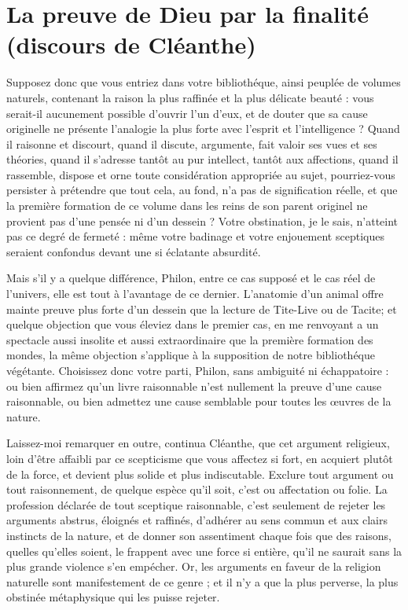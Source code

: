 
\section{La preuve de Dieu par la finalité (discours de Cléanthe)}
Supposez donc que vous entriez dans votre bibliothéque,
ainsi peuplée de volumes naturels, contenant la
raison la plus raffinée et la plus délicate beauté : vous
serait-il aucunement possible d’ouvrir l’un d’eux, et de
douter que sa cause originelle ne présente l'analogie la
plus forte avec l’esprit et l'intelligence ? Quand il raisonne
et discourt, quand il discute, argumente, fait valoir ses
vues et ses théories, quand il s’adresse tantôt au pur
intellect, tantôt aux affections, quand il rassemble, dispose
et orne toute considération appropriée au sujet,
pourriez-vous persister à prétendre que tout cela, au fond,
n’a pas de signification réelle, et que la première formation
de ce volume dans les reins de son parent originel ne
provient pas d’une pensée ni d’un dessein ? Votre obstination,
je le sais, n’atteint pas ce degré de fermeté : même
votre badinage et votre enjouement sceptiques seraient
confondus devant une si éclatante absurdité.

Mais s’il y a quelque différence, Philon, entre ce cas
supposé et le cas réel de l’univers, elle est tout à l’avantage
de ce dernier. L’anatomie d’un animal offre mainte preuve
plus forte d’un dessein que la lecture de Tite-Live ou de
Tacite; et quelque objection que vous éleviez dans le
premier cas, en me renvoyant a un spectacle aussi insolite
et aussi extraordinaire que la première formation des
mondes, la même objection s’applique à la supposition
de notre bibliothéque végétante. Choisissez donc votre
parti, Philon, sans ambiguité ni échappatoire : ou bien
affirmez qu’un livre raisonnable n’est nullement la preuve
d'une cause raisonnable, ou bien admettez une cause
semblable pour toutes les {\oe}uvres de la nature.

Laissez-moi remarquer en outre, continua Cléanthe,
que cet argument religieux, loin d’être affaibli par ce
scepticisme que vous affectez si fort, en acquiert plutôt
de la force, et devient plus solide et plus indiscutable.
Exclure tout argument ou tout raisonnement, de quelque
espèce qu’il soit, c’est ou affectation ou folie. La profession
déclarée de tout sceptique raisonnable, c’est seulement de
rejeter les arguments abstrus, éloignés et raffinés, d’adhérer
au sens commun et aux clairs instincts de la nature, et
de donner son assentiment chaque fois que des raisons,
quelles qu’elles soient, le frappent avec une force si entière,
qu’il ne saurait sans la plus grande violence s’en empécher.
Or, les arguments en faveur de la religion naturelle sont
manifestement de ce genre ; et il n’y a que la plus perverse,
la plus obstinée métaphysique qui les puisse rejeter.

